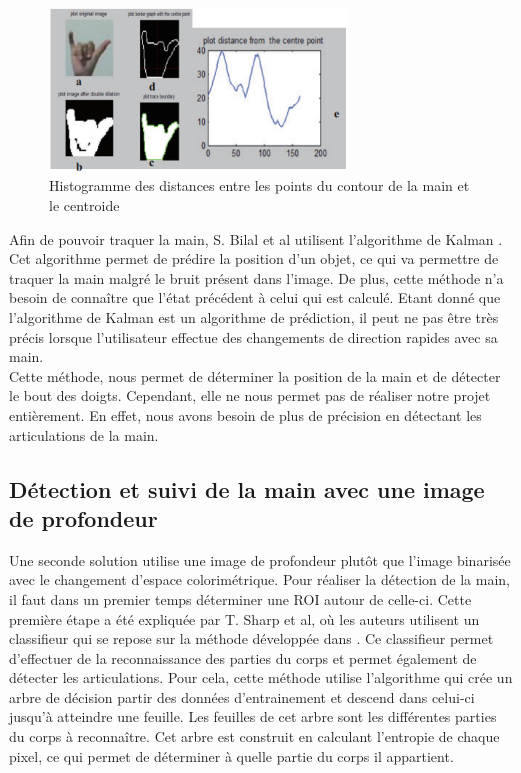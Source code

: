 \begin{figure}[!h]
\center
\includegraphics[width=300px]{images/handHisto.png}
\caption{Histogramme des distances entre les points du contour de la main et le centroide}
\label{fig:handHisto}
\end{figure}

\newpage

Afin de pouvoir traquer la main, S. Bilal et al \cite{haarlike} utilisent l'algorithme de Kalman \cite{kalman}.
Cet algorithme permet de prédire la position d'un objet, ce qui va permettre de traquer la main malgré
le bruit présent dans l'image. De plus, cette méthode n'a besoin de connaître que l'état précédent à celui 
qui est calculé. Etant donné que l'algorithme de Kalman est un algorithme de prédiction, il peut ne pas être très
précis lorsque l'utilisateur effectue des changements de direction rapides avec sa main.\\

Cette méthode, nous permet de déterminer la position de la main et de détecter le bout des doigts. Cependant, elle ne nous permet
pas de réaliser notre projet entièrement. En effet, nous avons besoin de plus de précision en détectant les articulations
de la main.

\subsection{Détection et suivi de la main avec une image de profondeur}
Une seconde solution utilise une image de profondeur plutôt que l'image binarisée avec le changement d'espace colorimétrique.
Pour réaliser la détection de la main, il faut dans un premier temps déterminer une ROI
autour de celle-ci. Cette première étape a été expliquée par T. Sharp et al\cite{export:238453}, où les auteurs utilisent un classifieur
qui se repose sur la méthode développée dans \cite{export:145347}. Ce classifieur permet d'effectuer de la reconnaissance
des parties du corps et permet également de détecter les articulations. Pour cela, cette méthode utilise l'algorithme \cite{lepetit2005randomized} qui crée un arbre de décision partir des données d'entrainement et descend dans celui-ci
jusqu'à atteindre une feuille. 
Les feuilles de cet arbre sont les différentes parties du corps à reconnaître. Cet arbre est construit en calculant
l'entropie de chaque pixel, ce qui permet de déterminer à quelle partie du corps il appartient.


